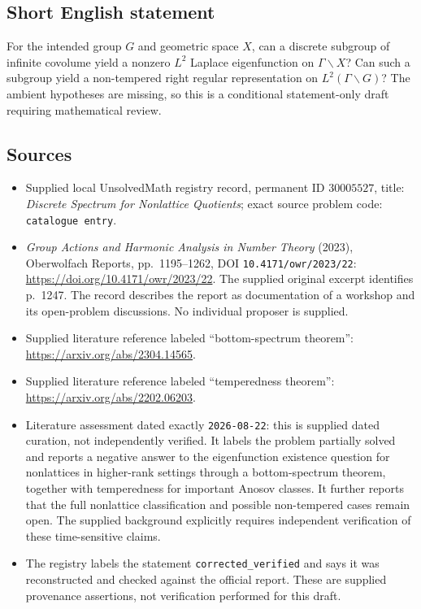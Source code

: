 \documentclass[11pt]{article}
\begin{document}
\subsection{Short English statement}
For the intended group \(G\) and geometric space \(X\), can a discrete subgroup of infinite covolume yield a nonzero \(L^2\) Laplace eigenfunction on \(\Gamma\backslash X\)? Can such a subgroup yield a non-tempered right regular representation on \(L^2(\Gamma\backslash G)\)? The ambient hypotheses are missing, so this is a conditional statement-only draft requiring mathematical review.
\subsection{Sources}
\begin{itemize}
\item Supplied local UnsolvedMath registry record, permanent ID \(30005527\), title: \emph{Discrete Spectrum for Nonlattice Quotients}; exact source problem code: \texttt{catalogue entry}.
\item \emph{Group Actions and Harmonic Analysis in Number Theory} (2023), Oberwolfach Reports, pp.\ 1195--1262, DOI \texttt{10.4171/owr/2023/22}: \url{https://doi.org/10.4171/owr/2023/22}. The supplied original excerpt identifies p.\ 1247. The record describes the report as documentation of a workshop and its open-problem discussions. No individual proposer is supplied.
\item Supplied literature reference labeled ``bottom-spectrum theorem'': \url{https://arxiv.org/abs/2304.14565}.
\item Supplied literature reference labeled ``temperedness theorem'': \url{https://arxiv.org/abs/2202.06203}.
\item Literature assessment dated exactly \texttt{2026-08-22}: this is supplied dated curation, not independently verified. It labels the problem partially solved and reports a negative answer to the eigenfunction existence question for nonlattices in higher-rank settings through a bottom-spectrum theorem, together with temperedness for important Anosov classes. It further reports that the full nonlattice classification and possible non-tempered cases remain open. The supplied background explicitly requires independent verification of these time-sensitive claims.
\item The registry labels the statement \texttt{corrected\_verified} and says it was reconstructed and checked against the official report. These are supplied provenance assertions, not verification performed for this draft.
\end{itemize}
\end{document}
